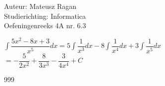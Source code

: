 \documentclass[a4paper]{article}
\begin{document}
\noindent \large Auteur: Mateusz Ragan \\
\noindent \large Studierichting: Informatica\\
\noindent \large Oefeningenreeks 4A nr. 6.3\\

\medskip

\normalsize

$\displaystyle\int\dfrac{5x^2-8x+3}{x^5}dx = 5\displaystyle\int\dfrac{1}{x^3}dx-8\displaystyle\int\dfrac{1}{x^4}dx+3\displaystyle\int\dfrac{1}{x^5}dx$\\

$= -\dfrac{5}{2x^2}+\dfrac{8}{3x^3}-\dfrac{3}{4x^4}+C$

\begin{thebibliography}{999}
\end{thebibliography}
\end{document}
